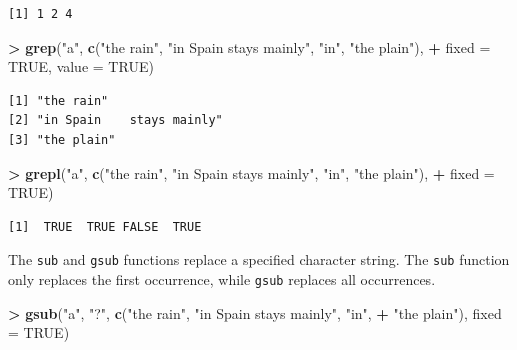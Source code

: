 \documentclass[
]{krantz}
\makeatletter
\newenvironment{Shaded}{\begin{snugshade}}{\end{snugshade}}
\newcommand{\DataTypeTok}[1]{\textcolor[rgb]{0.27,0.27,0.27}{#1}}
\newcommand{\KeywordTok}[1]{\textcolor[rgb]{0.27,0.27,0.27}{\textbf{#1}}}
\newcommand{\NormalTok}[1]{#1}
\newcommand{\OperatorTok}[1]{\textcolor[rgb]{0.43,0.43,0.43}{\textbf{#1}}}
\newcommand{\OtherTok}[1]{\textcolor[rgb]{0.37,0.37,0.37}{#1}}
\newcommand{\StringTok}[1]{\textcolor[rgb]{0.5,0.5,0.5}{#1}}
\newenvironment{kframe}{%
\medskip{}
\setlength{\fboxsep}{.8em}
 \def\at@end@of@kframe{}%
 \ifinner\ifhmode%
  \def\at@end@of@kframe{\end{minipage}}%
  \begin{minipage}{\columnwidth}%
 \fi\fi%
 \def\FrameCommand##1{\hskip\@totalleftmargin \hskip-\fboxsep
 \colorbox{shadecolor}{##1}\hskip-\fboxsep
     \hskip-\linewidth \hskip-\@totalleftmargin \hskip\columnwidth}%
 \MakeFramed {\advance\hsize-\width
   \@totalleftmargin\z@ \linewidth\hsize
   \@setminipage}}%
 {\par\unskip\endMakeFramed%
 \at@end@of@kframe}
\renewenvironment{Shaded}{\begin{kframe}}{\end{kframe}}
\makeatother
\begin{document}
\begin{verbatim}
[1] 1 2 4
\end{verbatim}

\begin{Shaded}
\begin{Highlighting}[]
\OperatorTok{\textgreater{}}\StringTok{ }\KeywordTok{grep}\NormalTok{(}\StringTok{"a"}\NormalTok{, }\KeywordTok{c}\NormalTok{(}\StringTok{"the rain"}\NormalTok{, }\StringTok{"in Spain    stays mainly"}\NormalTok{, }\StringTok{"in"}\NormalTok{, }\StringTok{"the plain"}\NormalTok{), }
\OperatorTok{+}\StringTok{      }\DataTypeTok{fixed =} \OtherTok{TRUE}\NormalTok{, }\DataTypeTok{value =} \OtherTok{TRUE}\NormalTok{)}
\end{Highlighting}
\end{Shaded}

\begin{verbatim}
[1] "the rain"                
[2] "in Spain    stays mainly"
[3] "the plain"               
\end{verbatim}

\begin{Shaded}
\begin{Highlighting}[]
\OperatorTok{\textgreater{}}\StringTok{ }\KeywordTok{grepl}\NormalTok{(}\StringTok{"a"}\NormalTok{, }\KeywordTok{c}\NormalTok{(}\StringTok{"the rain"}\NormalTok{, }\StringTok{"in Spain    stays mainly"}\NormalTok{, }\StringTok{"in"}\NormalTok{, }\StringTok{"the plain"}\NormalTok{), }
\OperatorTok{+}\StringTok{       }\DataTypeTok{fixed =} \OtherTok{TRUE}\NormalTok{)}
\end{Highlighting}
\end{Shaded}

\begin{verbatim}
[1]  TRUE  TRUE FALSE  TRUE
\end{verbatim}

The \texttt{sub} and \texttt{gsub} functions replace a specified character string. The \texttt{sub} function only replaces the first occurrence, while \texttt{gsub} replaces all occurrences.

\begin{Shaded}
\begin{Highlighting}[]
\OperatorTok{\textgreater{}}\StringTok{ }\KeywordTok{gsub}\NormalTok{(}\StringTok{"a"}\NormalTok{, }\StringTok{"?"}\NormalTok{, }\KeywordTok{c}\NormalTok{(}\StringTok{"the rain"}\NormalTok{, }\StringTok{"in Spain    stays mainly"}\NormalTok{, }\StringTok{"in"}\NormalTok{, }
\OperatorTok{+}\StringTok{                  "the plain"}\NormalTok{), }\DataTypeTok{fixed =} \OtherTok{TRUE}\NormalTok{)}
\end{Highlighting}
\end{Shaded}
\end{document}
